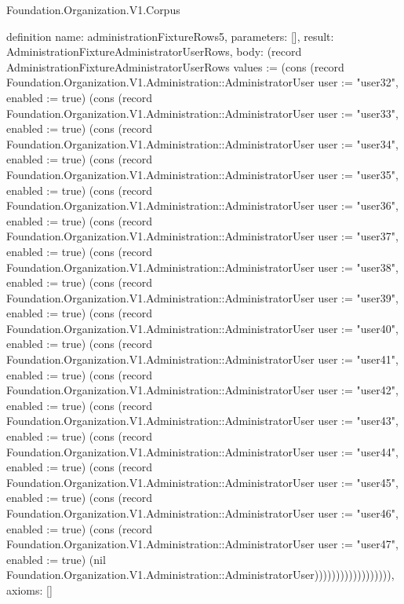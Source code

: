 \begin{lexlean}{Foundation.Organization.V1.Corpus}
\begin{semanticmodule}
definition{
  name: administrationFixtureRows5,
  parameters: [],
  result: AdministrationFixtureAdministratorUserRows,
  body: (record AdministrationFixtureAdministratorUserRows {values := (cons (record Foundation.Organization.V1.Administration::AdministratorUser {user := "user32", enabled := true}) (cons (record Foundation.Organization.V1.Administration::AdministratorUser {user := "user33", enabled := true}) (cons (record Foundation.Organization.V1.Administration::AdministratorUser {user := "user34", enabled := true}) (cons (record Foundation.Organization.V1.Administration::AdministratorUser {user := "user35", enabled := true}) (cons (record Foundation.Organization.V1.Administration::AdministratorUser {user := "user36", enabled := true}) (cons (record Foundation.Organization.V1.Administration::AdministratorUser {user := "user37", enabled := true}) (cons (record Foundation.Organization.V1.Administration::AdministratorUser {user := "user38", enabled := true}) (cons (record Foundation.Organization.V1.Administration::AdministratorUser {user := "user39", enabled := true}) (cons (record Foundation.Organization.V1.Administration::AdministratorUser {user := "user40", enabled := true}) (cons (record Foundation.Organization.V1.Administration::AdministratorUser {user := "user41", enabled := true}) (cons (record Foundation.Organization.V1.Administration::AdministratorUser {user := "user42", enabled := true}) (cons (record Foundation.Organization.V1.Administration::AdministratorUser {user := "user43", enabled := true}) (cons (record Foundation.Organization.V1.Administration::AdministratorUser {user := "user44", enabled := true}) (cons (record Foundation.Organization.V1.Administration::AdministratorUser {user := "user45", enabled := true}) (cons (record Foundation.Organization.V1.Administration::AdministratorUser {user := "user46", enabled := true}) (cons (record Foundation.Organization.V1.Administration::AdministratorUser {user := "user47", enabled := true}) (nil Foundation.Organization.V1.Administration::AdministratorUser)))))))))))))))))}),
  axioms: []
}


\end{semanticmodule}
\end{lexlean}
